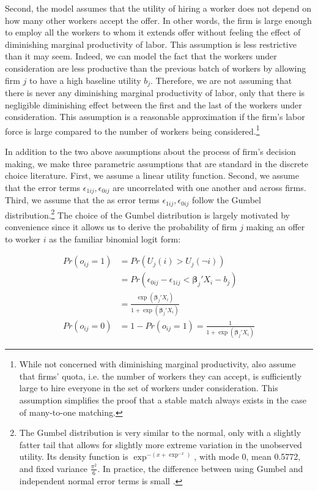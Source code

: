 Second, the model assumes that the utility of hiring a worker does not depend on
how many other workers accept the offer. In other words, the firm is large
enough to employ all the workers to whom it extends offer without feeling the
effect of diminishing marginal productivity of labor. This assumption is less
restrictive than it may seem. Indeed, we can model the fact that the workers
under consideration are less productive than the previous batch of workers by
allowing firm $j$ to have a high baseline utility $b_j$. Therefore, we are not
assuming that there is never any diminishing marginal productivity of labor,
only that there is negligible diminishing effect between the first and the last
of the workers under consideration. This assumption is a reasonable
approximation if the firm's labor force is large compared to the number of
workers being considered.\footnote{While not concerned with diminishing marginal
  productivity, \citet{Roth1992} also assume that firms' quota, i.e. the number
  of workers they can accept, is sufficiently large to hire everyone in the set
  of workers under consideration. This assumption simplifies the proof that a
  stable match always exists in the case of many-to-one matching.}

In addition to the two above assumptions about the process of firm's decision
making, we make three parametric assumptions that are standard in the discrete
choice literature. First, we assume a linear utility function. Second, we assume
that the error terms $\epsilon_{1ij}, \epsilon_{0ij}$ are uncorrelated with one
another and across firms. Third, we assume that the as error terms
$\epsilon_{1ij}, \epsilon_{0ij}$ follow the Gumbel distribution.\footnote{The
  Gumbel distribution is very similar to the normal, only with a slightly fatter
  tail that allows for slightly more extreme variation in the unobserved
  utility. Its density function is $\exp^{-(x + \exp^{-x})}$, with mode 0, mean
  0.5772, and fixed variance $\frac{\pi^2}{6}$. In practice, the difference
  between using Gumbel and independent normal error terms is small
  \citep{Train2009}.} The choice of the Gumbel distribution is largely motivated
by convenience since it allows us to derive the probability of firm $j$ making
an offer to worker $i$ as the familiar binomial logit form:

\begin{align}
  Pr(o_{ij} = 1) &= Pr(U_j(i) > U_j(\neg i)) \\
                 &= Pr(\epsilon_{0ij} - \epsilon_{1ij} <  \bm{\beta}_j ' X_i - b_j) \\
                 &= \frac{\exp({\bm{\beta}_j'X_i})}{1 + \exp({\bm{\beta}_j'X_i})} \label{eq:prob_offer_ij} \\
  Pr(o_{ij} = 0) &= 1 - Pr(o_{ij} = 1) = \frac{1}{1 + \exp({\bm{\beta}_j'X_i})}
\end{align}

